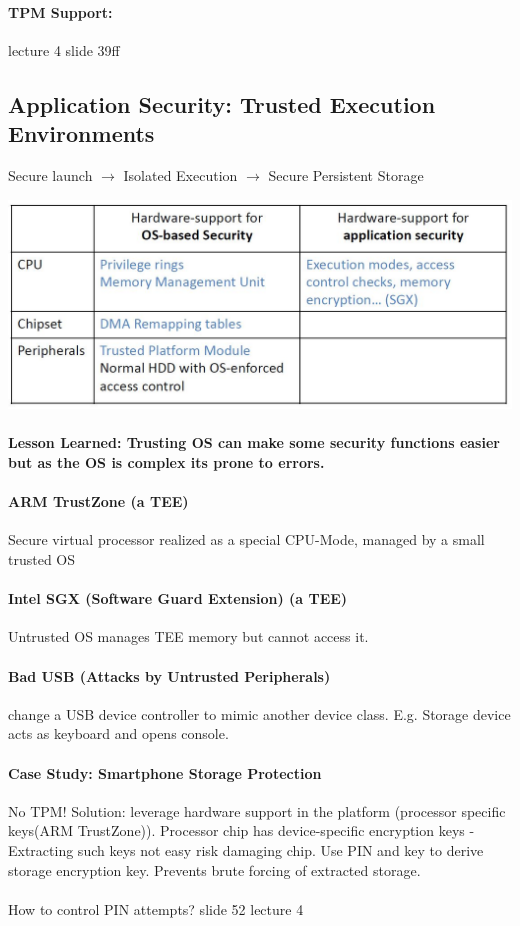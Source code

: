 \paragraph{TPM Support: } lecture 4 slide 39ff

\subsection{Application Security: Trusted Execution Environments}
Secure launch $\rightarrow$ Isolated Execution $\rightarrow$ Secure Persistent Storage

\includegraphics[scale=0.75]{Figures/App-Security.JPG}

\paragraph{Lesson Learned: Trusting OS can make some security functions easier but as the OS is complex its prone to errors.}

\paragraph{ARM TrustZone (a TEE)} Secure virtual processor realized as a special CPU-Mode, managed by a small trusted OS 

\paragraph{Intel SGX (Software Guard Extension) (a TEE)} Untrusted OS manages TEE memory but cannot access it.

\paragraph{Bad USB (Attacks by Untrusted Peripherals)} change a USB device controller to mimic another device class. E.g. Storage device acts as keyboard and opens console.

\paragraph{Case Study: Smartphone Storage Protection}
No TPM! Solution: leverage hardware support in the platform (processor specific keys(ARM TrustZone)). Processor chip has device-specific encryption keys - Extracting such keys not easy risk damaging chip. Use PIN and key to derive storage encryption key. Prevents brute forcing of extracted storage.
\\
\\
How to control PIN attempts? slide 52 lecture 4

